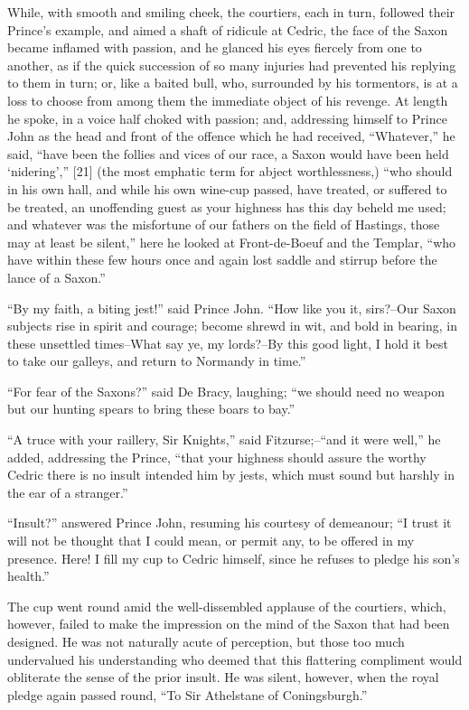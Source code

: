 While, with smooth and smiling cheek, the courtiers, each in turn,
followed their Prince's example, and aimed a shaft of ridicule at
Cedric, the face of the Saxon became inflamed with passion, and he
glanced his eyes fiercely from one to another, as if the quick
succession of so many injuries had prevented his replying to them in
turn; or, like a baited bull, who, surrounded by his tormentors, is at a
loss to choose from among them the immediate object of his revenge. At
length he spoke, in a voice half choked with passion; and, addressing
himself to Prince John as the head and front of the offence which he had
received, ``Whatever,'' he said, ``have been the follies and vices of
our race, a Saxon would have been held `nidering','' {[}21{]} (the most
emphatic term for abject worthlessness,) ``who should in his own hall,
and while his own wine-cup passed, have treated, or suffered to be
treated, an unoffending guest as your highness has this day beheld me
used; and whatever was the misfortune of our fathers on the field of
Hastings, those may at least be silent,'' here he looked at
Front-de-Boeuf and the Templar, ``who have within these few hours once
and again lost saddle and stirrup before the lance of a Saxon.''

``By my faith, a biting jest!'' said Prince John. ``How like you it,
sirs?--Our Saxon subjects rise in spirit and courage; become shrewd in
wit, and bold in bearing, in these unsettled times--What say ye, my
lords?--By this good light, I hold it best to take our galleys, and
return to Normandy in time.''

``For fear of the Saxons?'' said De Bracy, laughing; ``we should need no
weapon but our hunting spears to bring these boars to bay.''

``A truce with your raillery, Sir Knights,'' said Fitzurse;--``and it
were well,'' he added, addressing the Prince, ``that your highness
should assure the worthy Cedric there is no insult intended him by
jests, which must sound but harshly in the ear of a stranger.''

``Insult?'' answered Prince John, resuming his courtesy of demeanour;
``I trust it will not be thought that I could mean, or permit any, to be
offered in my presence. Here! I fill my cup to Cedric himself, since he
refuses to pledge his son's health.''

The cup went round amid the well-dissembled applause of the courtiers,
which, however, failed to make the impression on the mind of the Saxon
that had been designed. He was not naturally acute of perception, but
those too much undervalued his understanding who deemed that this
flattering compliment would obliterate the sense of the prior insult. He
was silent, however, when the royal pledge again passed round, ``To Sir
Athelstane of Coningsburgh.''

